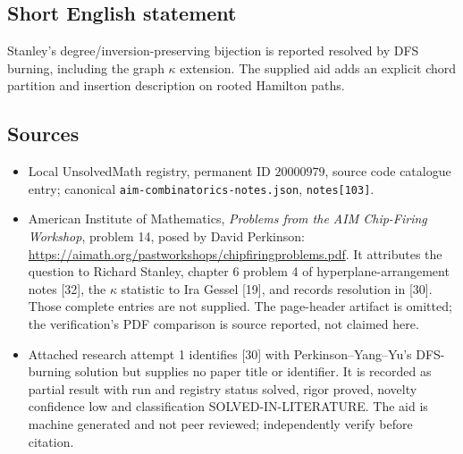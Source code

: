 \documentclass[11pt]{article}
\begin{document}
\subsection{Short English statement}
Stanley's degree/inversion-preserving bijection is reported resolved by DFS burning, including the graph $\kappa$ extension. The supplied aid adds an explicit chord partition and insertion description on rooted Hamilton paths.
\subsection{Sources}
\begin{itemize}
\item Local UnsolvedMath registry, permanent ID $20000979$, source code catalogue entry; canonical \texttt{aim-combinatorics-notes.json}, \texttt{notes[103]}.
\item American Institute of Mathematics, \emph{Problems from the AIM Chip-Firing Workshop}, problem 14, posed by David Perkinson: \url{https://aimath.org/pastworkshops/chipfiringproblems.pdf}. It attributes the question to Richard Stanley, chapter 6 problem 4 of hyperplane-arrangement notes [32], the $\kappa$ statistic to Ira Gessel [19], and records resolution in [30]. Those complete entries are not supplied. The page-header artifact is omitted; the verification's PDF comparison is source reported, not claimed here.
\item Attached research attempt 1 identifies [30] with Perkinson--Yang--Yu's DFS-burning solution but supplies no paper title or identifier. It is recorded as partial result with run and registry status solved, rigor proved, novelty confidence low and classification SOLVED-IN-LITERATURE. The aid is machine generated and not peer reviewed; independently verify before citation.
\end{itemize}
\end{document}
